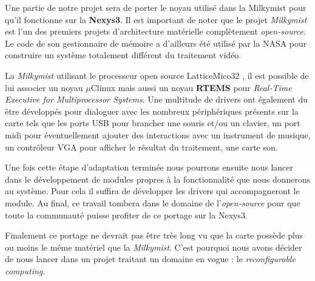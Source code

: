 Une partie de notre projet sera de porter le noyau utilisé dans la Milkymist \cite{MILKY_SITE}
pour qu'il fonctionne sur la {\bf Nexys3}. Il est important de noter que le
projet \textit{Milkymist} est l'un des premiers projets d'architecture matérielle
complètement \textit{open-source}. Le code de son gestionnaire de mémoire a d'ailleurs
été utilisé par la NASA pour construire un système totalement différent du
traitement vidéo.

La \textit{Milkymist} utilisant le processeur open source LatticeMico32 \cite{LATTICE}, il est possible
de lui associer un noyau $\mu$Clinux mais aussi un noyau {\bf RTEMS} pour
\textit{Real-Time Executive for Multiprocessor Systems}. Une multitude de drivers ont
également du être développés pour dialoguer avec les nombreux périphériques
présents sur la carte tels que les ports USB pour brancher une souris et/ou un
clavier, un port midi pour éventuellement ajouter des interactions avec un
instrument de musique, un contrôleur VGA pour afficher le résultat du
traitement, une carte son.

Une fois cette étape d'adaptation terminée nous pourrons ensuite nous lancer
dans le développement de modules propres à la fonctionnalité que nous donnerons
au système. Pour cela il suffira de développer les drivers qui accompagneront
le module. Au final, ce travail tombera dans le domaine de l'\textit{open-source} pour
que toute la communauté puisse profiter de ce portage sur la Nexys3.

Finalement ce portage ne devrait pas être très long vu que la carte possède
plus ou moins le même matériel que la \textit{Milkymist}. C'est pourquoi nous avons
décider de nous lancer dans un projet traitant un domaine en vogue : le \textit{reconfigurable computing}.

